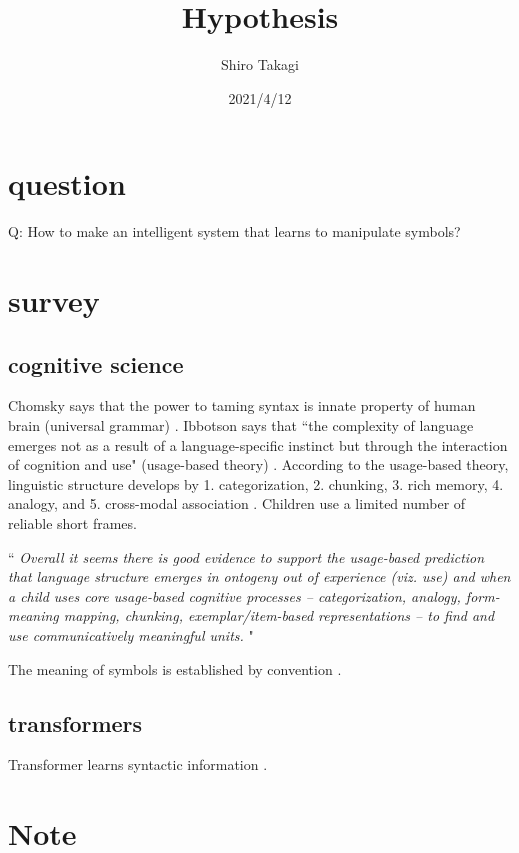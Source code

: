 \documentclass[12pt]{article}
\begin{document}
\title{Hypothesis}
\author{Shiro Takagi}
\date{2021/4/12}
\maketitle

\section{question}
Q: How to make an intelligent system that learns to manipulate symbols?

\section{survey}

\subsection{cognitive science}
Chomsky says that the power to taming syntax is innate property of 
human brain (universal grammar) \cite{Chomsky02}. 
Ibbotson says that ``the complexity of language emerges 
not as a result of a language-specific instinct 
but through the interaction of cognition and use" (usage-based theory) 
\cite{Ibbotson13}. According to the usage-based theory, linguistic 
structure develops by 1. categorization, 2. chunking, 3. rich memory, 
4. analogy, and 5. cross-modal association \cite{Bybee10,Ibbotson13}.
Children use a limited number of reliable short frames.


``
\textit{Overall it seems there is good evidence to support the usage-based 
prediction that language structure emerges in ontogeny out of 
experience (viz. use) and when a child uses core usage-based cognitive 
processes – categorization, analogy, form-meaning mapping, chunking, 
exemplar/item-based representations – to find and use communicatively 
meaningful units.} \cite{Ibbotson13}
"

The meaning of symbols is established by convention \cite{Santoro21,Taniguchi18,Mcclelland20}. 


\subsection{transformers}
Transformer learns syntactic information \cite{Reif19,Hewitt19,Goldberg19,Tenney19}.


\section{Note}



\end{document}
